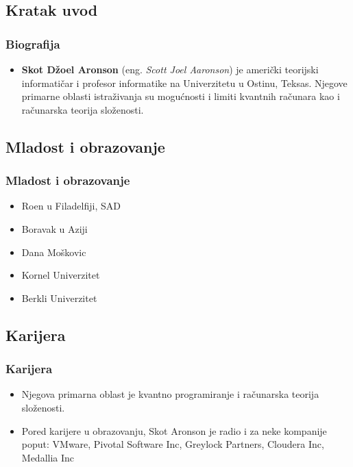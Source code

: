 \documentclass{beamer}
\def\dJ{{\fontencoding{T1}\selectfont\dj}}
\begin{document}
\subsection{Kratak uvod}
\begin{frame}[fragile]
    \frametitle{Biografija}
	\begin{itemize}
		\item \textbf{Skot Džoel Aronson} (eng. \textit{Scott Joel Aaronson}) je američki teorijski informatičar i profesor informatike na Univerzitetu u Ostinu, Teksas. Njegove primarne oblasti istraživanja su mogućnosti i limiti kvantnih računara kao i računarska teorija složenosti.
	\end{itemize}
\end{frame}
\subsection{Mladost i obrazovanje}
\begin{frame}
	\frametitle{Mladost i obrazovanje} 
	\begin{itemize}
	    \item Ro\dJ{}en u Filadelfiji, SAD
	    \item Boravak u Aziji
	    \item Dana Moškovic
	    \item Kornel Univerzitet
	    \item Berkli Univerzitet
	    
	\end{itemize}
\end{frame}

\subsection{Karijera}
\begin{frame}[fragile]\frametitle{Karijera}
	\begin{itemize}	
		\item Njegova primarna oblast je kvantno programiranje i računarska teorija složenosti.
		\item Pored karijere u obrazovanju, Skot Aronson je radio i za neke kompanije poput: VMware, Pivotal Software Inc, Greylock Partners, Cloudera Inc, Medallia Inc
	\end{itemize}
\end{frame}
\end{document}

